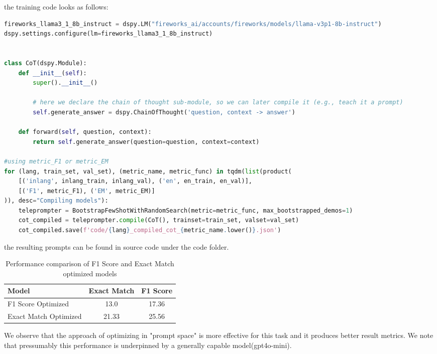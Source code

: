 \documentclass[11pt]{article}
\begin{document}
the training code looks as follows:

\begin{lstlisting}[language=Python]
fireworks_llama3_1_8b_instruct = dspy.LM("fireworks_ai/accounts/fireworks/models/llama-v3p1-8b-instruct")
dspy.settings.configure(lm=fireworks_llama3_1_8b_instruct)
    

class CoT(dspy.Module):  
    def __init__(self):
        super().__init__()

        # here we declare the chain of thought sub-module, so we can later compile it (e.g., teach it a prompt)
        self.generate_answer = dspy.ChainOfThought('question, context -> answer')
    
    def forward(self, question, context):
        return self.generate_answer(question=question, context=context)

#using metric_F1 or metric_EM
for (lang, train_set, val_set), (metric_name, metric_func) in tqdm(list(product(
    [('inlang', inlang_train, inlang_val), ('en', en_train, en_val)],
    [('F1', metric_F1), ('EM', metric_EM)]
)), desc="Compiling models"):
    teleprompter = BootstrapFewShotWithRandomSearch(metric=metric_func, max_bootstrapped_demos=1)
    cot_compiled = teleprompter.compile(CoT(), trainset=train_set, valset=val_set)
    cot_compiled.save(f'code/{lang}_compiled_cot_{metric_name.lower()}.json')
\end{lstlisting}

the resulting prompts can be found in source code under the code folder.


\begin{table}[ht]
    \centering
    \begin{tabular}{|l|c|c|}
        \hline
        Model & Exact Match & F1 Score \\
        \hline
        F1 Score Optimized & 13.0 & 17.36 \\
        Exact Match Optimized & 21.33 & 25.56 \\
        \hline
    \end{tabular}
    \caption{Performance comparison of F1 Score and Exact Match optimized models}
    \label{tab:prompt_optimized_week40_performance}
\end{table}

We observe that the approach of optimizing in "prompt space" is more effective for this task and it produces better result metrics.
We note that pressumably this performance is underpinned by a generally capable model(gpt4o-mini). 
\end{document}
